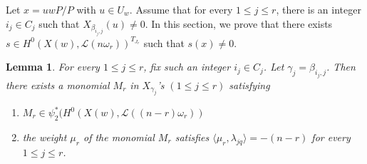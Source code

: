 \documentclass[12pt,reqno]{amsart}
\numberwithin{equation}{section}
\newtheorem{lemma}[theorem]{Lemma}
\theoremstyle{definition}
\begin{document}
Let $x=uwP/P$ with $u\in U_{w}$. Assume that for every $1\leq j\leq r$, there is an integer $i_{j}\in C_{j}$ such that $X_{\beta_{i_{j},j}}(u)\neq 0$. In this section, we prove that there exists $s\in H^{0}(X(w),\mathcal{L}(n\omega_{r}))^{T_{J_{r}}}$ such that $s(x)\neq 0$.
	\begin{lemma}\label{Special lemma 1}
		 For every $1\leq j\leq r$, fix such an integer $i_{j}\in C_{j}$. Let $\gamma_{j}=\beta_{i_{j},j}$. Then there exists a monomial $M_{r}$ in $X_{\gamma_{j}}$'s $(1\leq j\leq r)$ satisfying
		\begin{enumerate}
			\item $M_{r}\in \psi_{2}^{*}(H^{0}(X(w),\mathcal{L}((n-r)\omega_{r}))$
			\item the weight $\mu_r$ of the monomial $M_{r}$ satisfies $\langle\mu_r,\lambda_{jq}\rangle=-(n-r)$ for every $1\leq j\leq r$.
				\end{enumerate}
\end{lemma}
\end{document}
